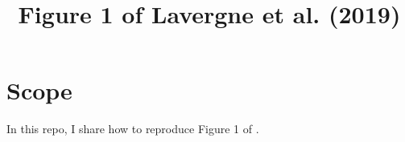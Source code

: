 \documentclass{article}
\begin{document}
\title{Figure 1 of Lavergne et al. (2019)}
\date{}
\maketitle

\section{Scope}

In this repo, I share how to reproduce Figure 1 of \cite{mypaper}.

\medskip



\end{document}
